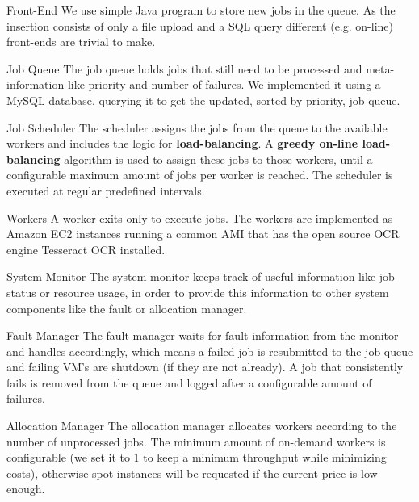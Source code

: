 \documentclass[a4paper]{IEEEtran}
\begin{document}
\begin{LaTeXdescription}

\item[Front-End] We use simple Java program to store new jobs in the queue. As the insertion consists of only a file upload and a SQL query different (e.g. on-line) front-ends are trivial to make.

\item[Job Queue]
The job queue holds jobs that still need to be processed and meta-information like priority and number of failures. We implemented it using a MySQL database, querying it to get the updated, sorted by priority, job queue.

\item[Job Scheduler]
The scheduler assigns the jobs from the queue to the available workers and includes the logic for \textbf{load-balancing}. A \textbf{greedy on-line load-balancing} algorithm \cite{kleinberg2006} is used to assign these jobs to those workers, until a configurable maximum amount of jobs per worker is reached. The scheduler is executed at regular predefined intervals.

\item[Workers]
A worker exits only to execute jobs. The workers are implemented as Amazon EC2 instances running a common AMI that has the open source OCR engine Tesseract OCR installed.

\item[System Monitor]
The system monitor keeps track of useful information like job status or resource usage, in order to provide this information to other system components like the fault or allocation manager.

\item[Fault Manager]
The fault manager waits for fault information from the monitor and handles accordingly, which means a failed job is resubmitted to the job queue and failing VM's are shutdown (if they are not already). A job that consistently fails is removed from the queue and logged after a configurable amount of failures.

\item[Allocation Manager]
The allocation manager allocates workers according to the number of unprocessed jobs. The minimum amount of on-demand workers is configurable (we set it to 1 to keep a minimum throughput while minimizing costs), otherwise spot instances will be requested if the current price is low enough.

\end{LaTeXdescription}
\end{document}
